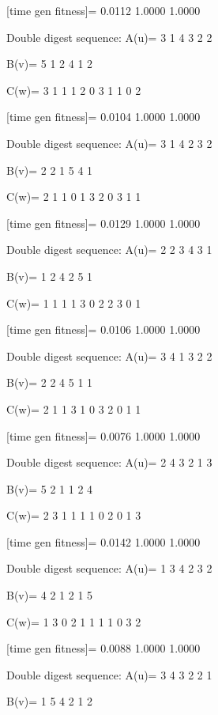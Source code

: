[time gen fitness]=
    0.0112    1.0000    1.0000

Double digest sequence:
A(u)=
     3     1     4     3     2     2

B(v)=
     5     1     2     4     1     2

C(w)=
     3     1     1     1     2     0     3     1     1     0     2

[time gen fitness]=
    0.0104    1.0000    1.0000

Double digest sequence:
A(u)=
     3     1     4     2     3     2

B(v)=
     2     2     1     5     4     1

C(w)=
     2     1     1     0     1     3     2     0     3     1     1

[time gen fitness]=
    0.0129    1.0000    1.0000

Double digest sequence:
A(u)=
     2     2     3     4     3     1

B(v)=
     1     2     4     2     5     1

C(w)=
     1     1     1     1     3     0     2     2     3     0     1

[time gen fitness]=
    0.0106    1.0000    1.0000

Double digest sequence:
A(u)=
     3     4     1     3     2     2

B(v)=
     2     2     4     5     1     1

C(w)=
     2     1     1     3     1     0     3     2     0     1     1

[time gen fitness]=
    0.0076    1.0000    1.0000

Double digest sequence:
A(u)=
     2     4     3     2     1     3

B(v)=
     5     2     1     1     2     4

C(w)=
     2     3     1     1     1     1     0     2     0     1     3

[time gen fitness]=
    0.0142    1.0000    1.0000

Double digest sequence:
A(u)=
     1     3     4     2     3     2

B(v)=
     4     2     1     2     1     5

C(w)=
     1     3     0     2     1     1     1     1     0     3     2

[time gen fitness]=
    0.0088    1.0000    1.0000

Double digest sequence:
A(u)=
     3     4     3     2     2     1

B(v)=
     1     5     4     2     1     2

